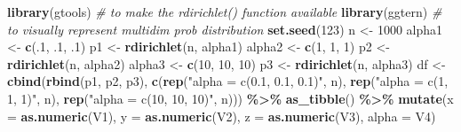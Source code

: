 \documentclass[
  12pt,
]{krantz}
\newenvironment{Shaded}{\begin{snugshade}}{\end{snugshade}}
\newcommand{\AttributeTok}[1]{\textcolor[rgb]{0.13,0.29,0.53}{#1}}
\newcommand{\CommentTok}[1]{\textcolor[rgb]{0.56,0.35,0.01}{\textit{#1}}}
\newcommand{\DecValTok}[1]{\textcolor[rgb]{0.00,0.00,0.81}{#1}}
\newcommand{\FunctionTok}[1]{\textcolor[rgb]{0.13,0.29,0.53}{\textbf{#1}}}
\newcommand{\NormalTok}[1]{#1}
\newcommand{\OtherTok}[1]{\textcolor[rgb]{0.56,0.35,0.01}{#1}}
\newcommand{\SpecialCharTok}[1]{\textcolor[rgb]{0.81,0.36,0.00}{\textbf{#1}}}
\newcommand{\StringTok}[1]{\textcolor[rgb]{0.31,0.60,0.02}{#1}}
\begin{document}
\begin{Shaded}
\begin{Highlighting}[]
\FunctionTok{library}\NormalTok{(gtools) }\CommentTok{\# to make the rdirichlet() function available}
\FunctionTok{library}\NormalTok{(ggtern) }\CommentTok{\# to visually represent multidim prob distribution }
\FunctionTok{set.seed}\NormalTok{(}\DecValTok{123}\NormalTok{)}
\NormalTok{n }\OtherTok{\textless{}{-}} \DecValTok{1000}
\NormalTok{alpha1 }\OtherTok{\textless{}{-}} \FunctionTok{c}\NormalTok{(.}\DecValTok{1}\NormalTok{, .}\DecValTok{1}\NormalTok{, .}\DecValTok{1}\NormalTok{)}
\NormalTok{p1 }\OtherTok{\textless{}{-}} \FunctionTok{rdirichlet}\NormalTok{(n, alpha1)}
\NormalTok{alpha2 }\OtherTok{\textless{}{-}} \FunctionTok{c}\NormalTok{(}\DecValTok{1}\NormalTok{, }\DecValTok{1}\NormalTok{, }\DecValTok{1}\NormalTok{)}
\NormalTok{p2 }\OtherTok{\textless{}{-}} \FunctionTok{rdirichlet}\NormalTok{(n, alpha2)}
\NormalTok{alpha3 }\OtherTok{\textless{}{-}} \FunctionTok{c}\NormalTok{(}\DecValTok{10}\NormalTok{, }\DecValTok{10}\NormalTok{, }\DecValTok{10}\NormalTok{)}
\NormalTok{p3 }\OtherTok{\textless{}{-}} \FunctionTok{rdirichlet}\NormalTok{(n, alpha3)}
\NormalTok{df }\OtherTok{\textless{}{-}} \FunctionTok{cbind}\NormalTok{(}\FunctionTok{rbind}\NormalTok{(p1, p2, p3), }\FunctionTok{c}\NormalTok{(}\FunctionTok{rep}\NormalTok{(}\StringTok{"alpha = c(0.1, 0.1, 0.1)"}\NormalTok{, n),}
                                     \FunctionTok{rep}\NormalTok{(}\StringTok{"alpha = c(1, 1, 1)"}\NormalTok{, n),}
                                     \FunctionTok{rep}\NormalTok{(}\StringTok{"alpha = c(10, 10, 10)"}\NormalTok{, n))) }\SpecialCharTok{\%\textgreater{}\%}
  \FunctionTok{as\_tibble}\NormalTok{() }\SpecialCharTok{\%\textgreater{}\%}
  \FunctionTok{mutate}\NormalTok{(}\AttributeTok{x =} \FunctionTok{as.numeric}\NormalTok{(V1),}
         \AttributeTok{y =} \FunctionTok{as.numeric}\NormalTok{(V2),}
         \AttributeTok{z =} \FunctionTok{as.numeric}\NormalTok{(V3),}
         \AttributeTok{alpha =}\NormalTok{ V4)}


\end{Highlighting}
\end{Shaded}
\end{document}
